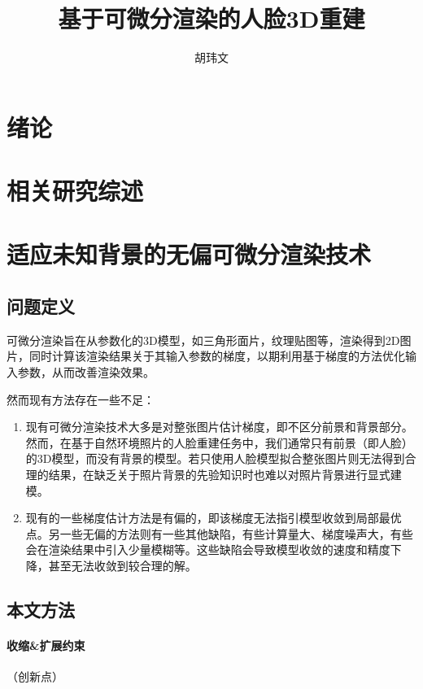 \documentclass{ctexart}
\title{基于可微分渲染的人脸3D重建}
\author{胡玮文}
\begin{document}
\maketitle

\tableofcontents

\listoffigures

\section{绪论}

\section{相关研究综述}

\section{适应未知背景的无偏可微分渲染技术}

\subsection{问题定义}

可微分渲染旨在从参数化的3D模型，如三角形面片，纹理贴图等，渲染得到2D图片，同时计算该渲染结果关于其输入参数的梯度，以期利用基于梯度的方法优化输入参数，从而改善渲染效果。

然而现有方法存在一些不足：
\begin{enumerate}
    \item 现有可微分渲染技术大多是对整张图片估计梯度，即不区分前景和背景部分。然而，在基于自然环境照片的人脸重建任务中，我们通常只有前景（即人脸）的3D模型，而没有背景的模型。若只使用人脸模型拟合整张图片则无法得到合理的结果，在缺乏关于照片背景的先验知识时也难以对照片背景进行显式建模。
    \item 现有的一些梯度估计方法是有偏的，即该梯度无法指引模型收敛到局部最优点。另一些无偏的方法则有一些其他缺陷，有些计算量大、梯度噪声大，有些会在渲染结果中引入少量模糊等。这些缺陷会导致模型收敛的速度和精度下降，甚至无法收敛到较合理的解。
\end{enumerate}

\subsection{本文方法}

\paragraph{收缩\&扩展约束}（创新点）
\end{document}
